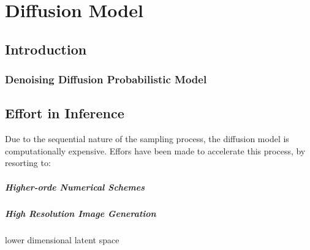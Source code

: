 \chapter{Diffusion Model}

\section{Introduction}

\subsection{Denoising Diffusion Probabilistic Model}

\textcite{ho2020denoising}

\section{Effort in Inference}

Due to the sequential nature of the sampling process, the diffusion model is computationally expensive.
Effors have been made to accelerate this process, by resorting to:
\paragraph*{Higher-orde Numerical Schemes}

\textcite{dockhorn2022genie}

\paragraph{High Resolution Image Generation}

lower dimensional latent space \parencite{rombach2022higha}

\printbibliography[heading=subbibliography]
